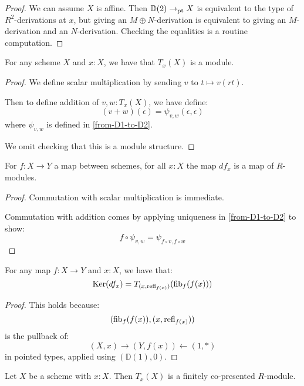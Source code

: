 \begin{proof}
We can assume $X$ is affine. Then $\mathbb{D}(2)\to_{\mathrm{pt}} X$ is equivalent to the type of $R^2$-derivations at $x$, but giving an $M\oplus N$-derivation is equivalent to giving an $M$-derivation and an $N$-derivation. Checking the equalities is a routine computation.
\end{proof}

\begin{lemma}
For any scheme $X$ and $x:X$, we have that $T_x(X)$ is a module.
\end{lemma}

\begin{proof}
We define scalar multiplication by sending $v$ to $t\mapsto v(rt)$.

Then to define addition of $v,w:T_x(X)$, we have define:
\[(v+w)(\epsilon) = \psi_{v,w}(\epsilon,\epsilon)\]
where $\psi_{v,w}$ is defined in \cref{from-D1-to-D2}.

We omit checking that this is a module structure.
\end{proof}

\begin{lemma}
For $f:X\to Y$ a map between schemes, for all $x:X$ the map $df_x$ is a map of $R$-modules.
\end{lemma}

\begin{proof}
Commutation with scalar multiplication is immediate.

Commutation with addition comes by applying uniqueness in \cref{from-D1-to-D2} to show:
\[f\circ \psi_{v,w} = \psi_{f\circ v,f\circ w}\]
\end{proof}

\begin{lemma}\label{kernel-is-tangent-of-fibers}
For any map $f:X\to Y$ and $x:X$, we have that:
\[
\mathrm{Ker}(df_x) = T_{(x,\mathrm{refl}_{f(x)})}(\mathrm{fib}_f(f(x)))
\]
\end{lemma}

\begin{proof}
This holds because:
\[
(\mathrm{fib}_f(f(x)),(x,\mathrm{refl}_{f(x)}))
\]
is the pullback of:
\[
(X,x) \to (Y,f(x)) \leftarrow (1,*)
\]
in pointed types, applied using $(\mathbb{D}(1),0)$.
\end{proof}

\begin{lemma}
Let $X$ be a scheme with $x : X$. Then $T_x(X)$ is a finitely
co-presented $R$-module.
\end{lemma}

